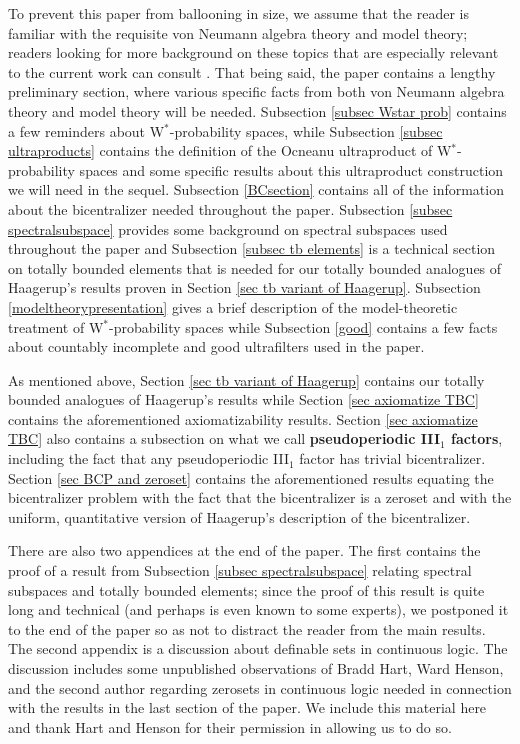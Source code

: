 \documentclass[12pt]{amsart}
\theoremstyle{definition}
\begin{document}
To prevent this paper from ballooning in size, we assume that the reader is familiar with the requisite von Neumann algebra theory and model theory; readers looking for more background on these topics that are especially relevant to the current work can consult \cite{andoultra,AH14,AGHS25,goldbringhoudayer}.  That being said, the paper contains a lengthy preliminary section, where various specific facts from both von Neumann algebra theory and model theory will be needed.  Subsection \ref{subsec Wstar prob} contains a few reminders about W$^*$-probability spaces, while Subsection \ref{subsec ultraproducts} contains the definition of the Ocneanu ultraproduct of W$^*$-probability spaces and some specific results about this ultraproduct construction we will need in the sequel.  Subsection \ref{BCsection} contains all of the information about the bicentralizer needed throughout the paper.  Subsection \ref{subsec spectralsubspace} provides some background on spectral subspaces used throughout the paper and Subsection \ref{subsec tb elements} is a technical section on totally bounded elements that is needed for our totally bounded analogues of Haagerup's results proven in Section \ref{sec tb variant of Haagerup}.  Subsection \ref{modeltheorypresentation} gives a brief description of the model-theoretic treatment of W$^*$-probability spaces while Subsection \ref{good} contains a few facts about countably incomplete and good ultrafilters used in the paper.  


As mentioned above, Section \ref{sec tb variant of Haagerup} contains our totally bounded analogues of Haagerup's results while Section \ref{sec axiomatize TBC} contains the aforementioned axiomatizability results.  Section \ref{sec axiomatize TBC} also contains a subsection on what we call \textbf{pseudoperiodic III$_1$ factors}, including the fact that any pseudoperiodic III$_1$ factor has trivial bicentralizer.  Section \ref{sec BCP and zeroset} contains the aforementioned results equating the bicentralizer problem with the fact that the bicentralizer is a zeroset and with the uniform, quantitative version of Haagerup's description of the bicentralizer. 

There are also two appendices at the end of the paper.  The first contains the proof of a result from Subsection \ref{subsec spectralsubspace} relating spectral subspaces and totally bounded elements; since the proof  of this result is quite long and technical (and perhaps is even known to some experts), we postponed it to the end of the paper so as not to distract the reader from the main results.  The second appendix is a discussion about definable sets in continuous logic.  The discussion 
includes some unpublished observations of Bradd Hart, Ward Henson, and the second author regarding zerosets in continuous logic needed in connection with the results in the last section of the paper.  We include this material here and thank Hart and Henson for their permission in allowing us to do so.
\end{document}
